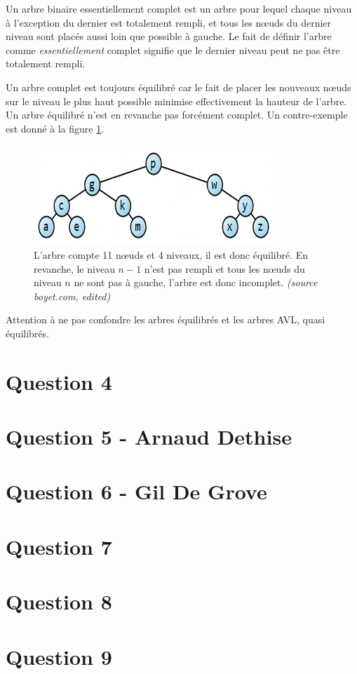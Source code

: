 \documentclass[10pt,a4paper]{article}
\begin{document}
	Un arbre binaire essentiellement complet est un arbre pour lequel chaque niveau à l'exception du dernier est totalement rempli, et tous les nœuds du dernier niveau sont placés aussi loin que possible à gauche.
	Le fait de définir l'arbre comme \textit{essentiellement} complet signifie que le dernier niveau peut ne pas être totalement rempli.
	
	Un arbre complet est toujours équilibré car le fait de placer les nouveaux nœuds sur le niveau le plus haut possible minimise effectivement la hauteur de l'arbre.
	Un arbre équilibré n'est en revanche pas forcément complet. Un contre-exemple est donné à la figure \ref{balanced_incomplete_tree}.
	
	\begin{figure}[!h]
	\begin{center}
		\includegraphics[scale=.7]{q3-balanced_incomplete_tree.png}
		\caption{L'arbre compte 11 nœuds et 4 niveaux, il est donc équilibré. En revanche, le niveau $n-1$ n'est pas rempli et tous les nœuds du niveau $n$ ne sont pas à gauche, l'arbre est donc incomplet. \textit{(source boyet.com, edited)}}
		\label{balanced_incomplete_tree}
	\end{center}
	\end{figure}
	
	Attention à ne pas confondre les arbres équilibrés et les arbres AVL, quasi équilibrés.


\section*{Question 4}
\section*{Question 5 - Arnaud Dethise}
\section*{Question 6 - Gil De Grove}

\section*{Question 7}
\section*{Question 8}
\section*{Question 9}
\end{document}
